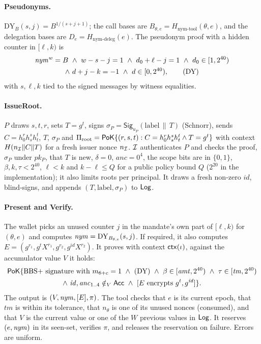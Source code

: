 \paragraph{Pseudonyms.} $\mathrm{DY}_B(s,j)=B^{1/(s+j+1)}$; the call bases are $B_{\theta,e}=H_{\text{nym-tool}}(\theta,e)$, and the delegation bases are $D_e=H_{\text{nym-deleg}}(e)$. The pseudonym proof with a hidden counter in $[\ell,k)$ is
\begin{multline*}
\nym^{w}=B\ \wedge\ w-s-j=1\ \wedge\ d_0+\ell-j=1\ \wedge\ d_0\in[1,2^{40})\\ \wedge\ d+j-k=-1\ \wedge\ d\in[0,2^{40}),\tag{DY}
\end{multline*}
with $s,\ell,k$ tied to the signed messages by witness equalities.

\paragraph{IssueRoot.} $P$ draws $s,t,r$, sets $T=g^{t}$, signs $\sigma_P=\mathsf{Sig}_{u_P}(\text{label}\,\|\,T)$ (Schnorr), sends $C=h_0^{r}h_s^{s}h_t^{t}$, $T$, $\sigma_P$ and $\Pi_{\mathrm{root}}=\mathsf{PoK}\{(r,s,t):C=h_0^rh_s^sh_t^t\wedge T=g^t\}$ with context $H(n_{\mathcal{I}}\|C\|T)$ for a fresh issuer nonce $n_{\mathcal{I}}$. $\mathcal{I}$ authenticates $P$ and checks the proof, $\sigma_P$ under $pk_P$, that $T$ is new, $\delta=0$, $\mathit{anc}=0^4$, the scope bits are in $\{0,1\}$, $\beta,k,\tau<2^{40}$, $\ell<k$ and $k-\ell\le Q$ for a public policy bound $Q$ ($2^{20}$ in the implementation); it also limits roots per principal. It draws a fresh non-zero $\mathit{id}$, blind-signs, and appends $(T,\text{label},\sigma_P)$ to $\mathsf{Log}$.

\paragraph{Present and Verify.} The wallet picks an unused counter $j$ in the mandate's own part of $[\ell,k)$ for $(\theta,e)$ and computes $\mathit{nym}=\mathrm{DY}_{B_{\theta,e}}(s,j)$. If required, it also computes $E=(g^{r_1},g^{t}X^{r_1},g^{r_2},g^{\mathit{id}}X^{r_2})$. It proves with context $\mathsf{ctx}(\iota)$, against the accumulator value $V$ it holds:
\begin{multline*}
\PoK\{\text{BBS+ signature with } m_{6+c}=1\ \wedge\ (\mathrm{DY})\ \wedge\ \beta\in[\mathit{amt},2^{40})\ \wedge\ \tau\in[\mathit{tm},2^{40})\\ \wedge\ \mathit{id},\mathit{anc}_{1..4}\notin_{V}\mathsf{Acc}\ \wedge\ [E\text{ encrypts } g^{t},g^{\mathit{id}}]\}.
\end{multline*}
The output is $(V,\mathit{nym},[E],\pi)$. The tool checks that $e$ is its current epoch, that $\mathit{tm}$ is within its tolerance, that $n_\theta$ is one of its unused nonces (consumed), and that $V$ is the current value or one of the $W$ previous values in $\mathsf{Log}$. It reserves $(e,\mathit{nym})$ in its seen-set, verifies $\pi$, and releases the reservation on failure. Errors are uniform.

